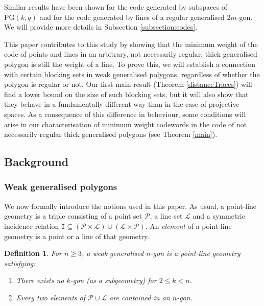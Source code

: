 \documentclass[12pt]{article}
\newcommand{\PG}{\mathrm{PG}}
\newcommand{\Points}{\mathcal{P}}
\newcommand{\Lines}{\mathcal{L}}
\newcommand{\I}{\mathtt{I}}
\newtheorem{definition}{Definition}
\theoremstyle{remark}
\begin{document}
Similar results have been shown for the code generated by subspaces of $\PG(k,q)$ and for the code generated by lines of a regular generalised $2m$-gon. We will provide more details in Subsection \ref{subsection:codes}.

This paper contributes to this study by showing that the minimum weight of the code of points and lines in an arbitrary, not necessarily regular, thick generalised polygon is still the weight of a line. To prove this, we will establish a connection with certain blocking sets in weak generalised polygons, regardless of whether the polygon is regular or not. Our first main result (Theorem \ref{distanceTraces}) will find a lower bound on the size of such blocking sets, but it will also show that they behave in a fundamentally different way than in the case of projective spaces.
As a consequence of this difference in behaviour, some conditions will arise in our characterisation of minimum weight codewords in the code of not necessarily regular thick generalised polygons (see Theorem \ref{main}).


\subsection{Background}

\subsubsection{Weak generalised polygons}

We now formally introduce the notions used in this paper. As usual, a point-line geometry is a triple consisting of a point set $\Points$, a line set $\Lines$ and a symmetric incidence relation \(\I\subseteq(\Points\times\Lines) \cup (\Lines\times\Points)\). An {\em element} of a point-line geometry is a point or a line of that geometry.


\begin{definition}
	For \(n\ge 3\), a {\em weak generalised $n$-gon} is a point-line geometry satisfying:   
	\begin{enumerate}[(GP1)]
		\item There exists no \(k\)-gon (as a subgeometry) for \(2 \le k < n\).
		\item Every two elements of \(\Points \cup \Lines\) are contained in an \(n\)-gon.
	\end{enumerate}
\end{definition}
\end{document}
